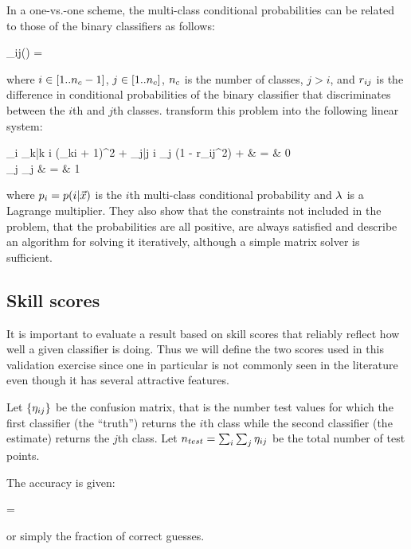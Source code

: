 In a one-vs.-one scheme, the multi-class conditional probabilities 
can be related to those of the binary classifiers as follows:
\begin{eqnnon}
	\diffcondprob_{ij}(\point) = 
	\label{bin2multi}
\end{eqnnon}
where $i \in [1..n_c-1]$, $j \in [1..n_c]$, $n_c$ is the number of classes, $j>i$,
and $r_{ij}$ is the difference in conditional probabilities of
the binary classifier that discriminates between the $i$th and $j$th classes.
\citet{Wu_etal2004} transform this problem into the following linear system:
\begin{eqnarraynon}
	\multiprob_i \sum_{k|k \ne i} (\diffcondprob_{ki} + 1)^2 +
	\sum_{j|j \ne i} \multiprob_j (1 - r_{ij}^2) + \lmult & = & 0 \\ \nonumber
	\sum_j \multiprob_j & = & 1
	\label{multiclass}
\end{eqnarraynon}
where $p_i = p(i | \vec {x})$ is the $i$th multi-class 
conditional probability and $\lambda$ is a Lagrange multiplier.
They also show that the constraints not included in the problem, that
the probabilities are all positive, are always satisfied
and describe an algorithm for solving it iteratively, although a
simple matrix solver is sufficient.

\subsection{Skill scores}

\label{skill_scores}

It is important to evaluate a result based on skill scores that reliably reflect
how well a given classifier is doing.
Thus we will define the two scores used in this validation exercise 
since one in particular is not commonly seen in the literature even though it has several
attractive features.

Let $\lbrace \eta_{ij} \rbrace$ be the confusion matrix, that is the number
test values for which the first classifier (the ``truth'') returns the $i$th class
while the second classifier (the estimate) returns the $j$th class.
Let $n_{test}=\sum_i \sum_j \eta_{ij}$ be the total number of test points.

The accuracy is given:
\begin{eqnnon}
\accuracy=
\label{accuracy}
\end{eqnnon}
or simply the fraction of correct guesses.

